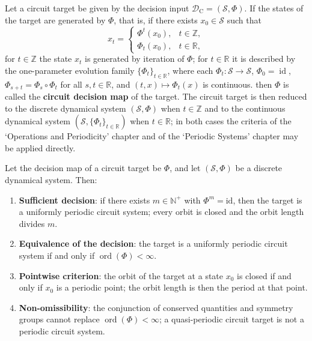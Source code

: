 \begin{definition}\label{def:circuit_periodization}
Let a circuit target be given by the decision input $\mathcal D_{\mathrm{C}}=(\mathcal S,\Phi)$. If the states of the target are generated by $\Phi$, that is, if there exists $x_0\in\mathcal S$ such that
\[
x_t=\begin{cases}\Phi^t(x_0), & t\in\mathbb Z,\\ \Phi_t(x_0), & t\in\mathbb R,\end{cases}
\]
for $t\in\mathbb Z$ the state $x_t$ is generated by iteration of $\Phi$; for $t\in\mathbb R$ it is described by the one-parameter evolution family $\{\Phi_t\}_{t\in\mathbb R}$, where each $\Phi_t:\mathcal S\to\mathcal S$, $\Phi_0=\operatorname{id}$, $\Phi_{s+t}=\Phi_s\circ\Phi_t$ for all $s,t\in\mathbb R$, and $(t,x)\mapsto\Phi_t(x)$ is continuous.
then $\Phi$ is called the \textbf{circuit decision map} of the target. The circuit target is then reduced to the discrete dynamical system $(\mathcal S,\Phi)$ when $t\in\mathbb Z$ and to the continuous dynamical system $(\mathcal S,\{\Phi_t\}_{t\in\mathbb R})$ when $t\in\mathbb R$; in both cases the criteria of the `Operations and Periodicity' chapter and of the `Periodic Systems' chapter may be applied directly.
\end{definition}

\begin{theorem}\label{thm:circuit_periodicity_decision}
Let the decision map of a circuit target be $\Phi$, and let $(\mathcal S,\Phi)$ be a discrete dynamical system. Then:
\begin{enumerate}[label=(\Alph*)]
    \item \textbf{Sufficient decision}: if there exists $m\in\mathbb N^+$ with $\Phi^m=\mathrm{id}$, then the target is a uniformly periodic circuit system; every orbit is closed and the orbit length divides $m$.
    \item \textbf{Equivalence of the decision}: the target is a uniformly periodic circuit system if and only if $\operatorname{ord}(\Phi)<\infty$.
    \item \textbf{Pointwise criterion}: the orbit of the target at a state $x_0$ is closed if and only if $x_0$ is a periodic point; the orbit length is then the period at that point.
    \item \textbf{Non-omissibility}: the conjunction of conserved quantities and symmetry groups cannot replace $\operatorname{ord}(\Phi)<\infty$; a quasi-periodic circuit target is not a periodic circuit system.
\end{enumerate}
\end{theorem}

